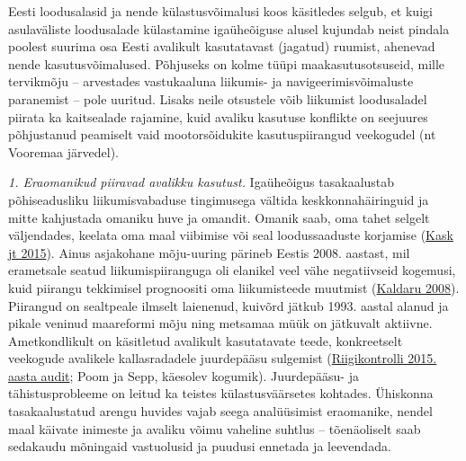 \documentclass[estonian,]{article}
\begin{document}
Eesti loodusalasid ja nende külastusvõimalusi koos käsitledes selgub, et kuigi asulaväliste loodusalade külastamine igaüheõiguse alusel kujundab neist pindala poolest suurima osa Eesti avalikult kasutatavast (jagatud) ruumist, ahenevad nende kasutusvõimalused. Põhjuseks on kolme tüüpi maakasutusotsuseid, mille tervikmõju -- arvestades vastukaaluna liikumis- ja navigeerimisvõimaluste paranemist -- pole uuritud. Lisaks neile otsustele võib liikumist loodusaladel piirata ka kaitsealade rajamine, kuid avaliku kasutuse konflikte on seejuures põhjustanud peamiselt vaid mootorsõidukite kasutuspiirangud veekogudel (nt Vooremaa järvedel).

\emph{1. Eraomanikud piiravad avalikku kasutust.} Igaüheõigus tasakaalustab põhiseadusliku liikumisvabaduse tingimusega vältida keskkonnahäiringuid ja mitte kahjustada omaniku huve ja omandit. Omanik saab, oma tahet selgelt väljendades, keelata oma maal viibimise või seal loodussaaduste korjamise (\protect\hyperlink{Kask2015}{Kask jt 2015}). Ainus asjakohane mõju-uuring pärineb Eestis 2008. aastast, mil erametsale seatud liikumispiiranguga oli elanikel veel vähe negatiivseid kogemusi, kuid piirangu tekkimisel prognoositi oma liikumisteede muutmist (\protect\hyperlink{Kaldaru2008}{Kaldaru 2008}). Piirangud on sealtpeale ilmselt laienenud, kuivõrd jätkub 1993. aastal alanud ja pikale veninud maareformi mõju ning metsamaa müük on jätkuvalt aktiivne. Ametkondlikult on käsitletud avalikult kasutatavate teede, konkreetselt veekogude avalikele kallasradadele juurdepääsu sulgemist (\protect\hyperlink{Riigikontroll2015}{Riigikontrolli 2015. aasta audit}; Poom ja Sepp, käesolev kogumik). Juurdepääsu- ja tähistusprobleeme on leitud ka teistes külastusväärsetes kohtades. Ühiskonna tasakaalustatud arengu huvides vajab seega analüüsimist eraomanike, nendel maal käivate inimeste ja avaliku võimu vaheline suhtlus -- tõenäoliselt saab sedakaudu mõningaid vastuolusid ja puudusi ennetada ja leevendada.
\end{document}
